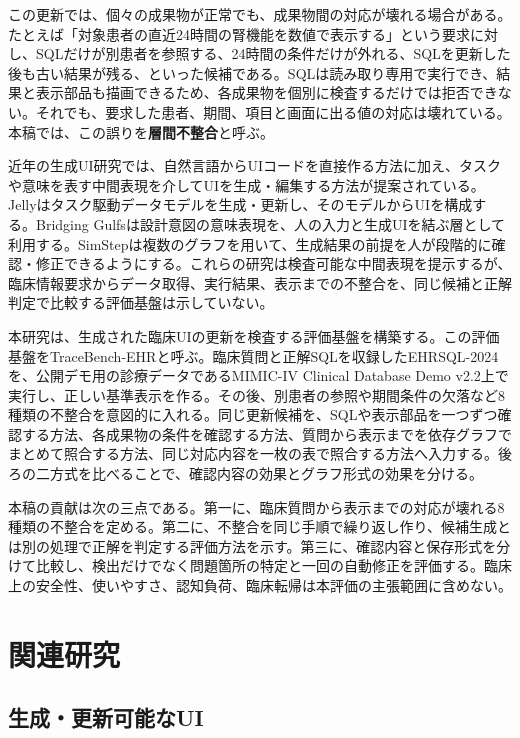 \documentclass[a4paper]{jsarticle}
\newcommand{\term}[1]{\textbf{#1}}
\begin{document}
この更新では、個々の成果物が正常でも、成果物間の対応が壊れる場合がある。たとえば「対象患者の直近24時間の腎機能を数値で表示する」という要求に対し、SQLだけが別患者を参照する、24時間の条件だけが外れる、SQLを更新した後も古い結果が残る、といった候補である。SQLは読み取り専用で実行でき、結果と表示部品も描画できるため、各成果物を個別に検査するだけでは拒否できない。それでも、要求した患者、期間、項目と画面に出る値の対応は壊れている。本稿では、この誤りを\term{層間不整合}と呼ぶ。

近年の生成UI研究では、自然言語からUIコードを直接作る方法に加え、タスクや意味を表す中間表現を介してUIを生成・編集する方法が提案されている。Jellyはタスク駆動データモデルを生成・更新し、そのモデルからUIを構成する\cite{cao2025jelly}。Bridging Gulfsは設計意図の意味表現を、人の入力と生成UIを結ぶ層として利用する\cite{park2026bridging}。SimStepは複数のグラフを用いて、生成結果の前提を人が段階的に確認・修正できるようにする\cite{kaputa2026simstep}。これらの研究は検査可能な中間表現を提示するが、臨床情報要求からデータ取得、実行結果、表示までの不整合を、同じ候補と正解判定で比較する評価基盤は示していない。

本研究は、生成された臨床UIの更新を検査する評価基盤を構築する。この評価基盤をTraceBench-EHRと呼ぶ。臨床質問と正解SQLを収録したEHRSQL-2024\cite{lee2024ehrsql}を、公開デモ用の診療データであるMIMIC-IV Clinical Database Demo v2.2\cite{johnson2023mimic}上で実行し、正しい基準表示を作る。その後、別患者の参照や期間条件の欠落など8種類の不整合を意図的に入れる。同じ更新候補を、SQLや表示部品を一つずつ確認する方法、各成果物の条件を確認する方法、質問から表示までを依存グラフでまとめて照合する方法、同じ対応内容を一枚の表で照合する方法へ入力する。後ろの二方式を比べることで、確認内容の効果とグラフ形式の効果を分ける。

本稿の貢献は次の三点である。第一に、臨床質問から表示までの対応が壊れる8種類の不整合を定める。第二に、不整合を同じ手順で繰り返し作り、候補生成とは別の処理で正解を判定する評価方法を示す。第三に、確認内容と保存形式を分けて比較し、検出だけでなく問題箇所の特定と一回の自動修正を評価する。臨床上の安全性、使いやすさ、認知負荷、臨床転帰は本評価の主張範囲に含めない。

\section{関連研究}

\subsection{生成・更新可能なUI}
\end{document}
